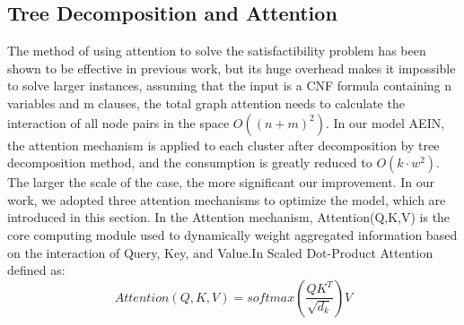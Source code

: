 \subsection{Tree Decomposition and Attention}
The method of using attention to solve the satisfactibility problem has been shown to be effective in previous work, but its huge overhead makes it impossible to solve larger instances, assuming that the input is a CNF formula containing n variables and m clauses, the total graph attention needs to calculate the interaction of all node pairs in the space \(O((n+m)^2)\). In our model AEIN, the attention mechanism is applied to each cluster after decomposition by tree decomposition method, and the consumption is greatly reduced to \(O(k⋅w^2)\). The larger the scale of the case, the more significant our improvement.
In our work, we adopted three attention mechanisms to optimize the model, which are introduced in this section.
In the Attention mechanism, Attention(Q,K,V) is the core computing module used to dynamically weight aggregated information based on the interaction of Query, Key, and Value.In Scaled Dot-Product Attention defined as:
\begin{equation}
Attention(Q,K,V)=softmax(\frac{QK^T}{\sqrt{d_k}})V
\end{equation}
